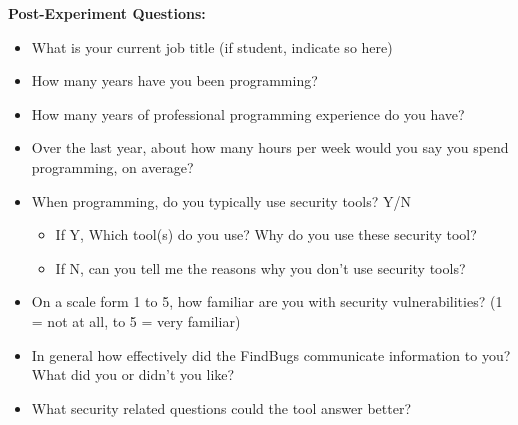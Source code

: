 \documentclass[10pt,journal,compsoc]{IEEEtran}
\begin{document}
\textbf{Post-Experiment Questions:}
\begin{itemize}
\item What is your current job title (if student, indicate so here)
\item How many years have you been programming?
\item How many years of professional programming experience do you have?
\item Over the last year, about how many hours per week would you say you spend programming, on
average?
\item When programming, do you typically use security tools? Y/N
\begin{itemize}
	\item If Y, Which tool(s) do you use? Why do you use these security tool?
	\item If N, can you tell me the reasons why you don't use security tools?
\end{itemize}
\item On a scale form 1 to 5, how familiar are you with security vulnerabilities?
(1 = not at all, to 5 = very familiar)
\item In general how effectively did the FindBugs communicate information to you? What did you or didn’t you like?
\item What security related questions could the tool answer better?
\end{itemize}



%



\end{document}
